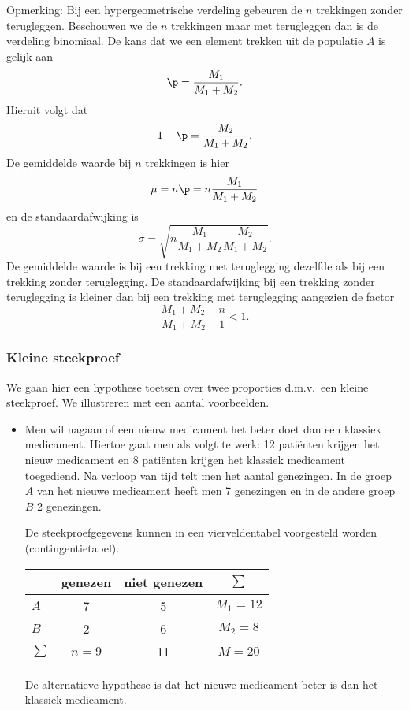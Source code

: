 {\begin{enumerate}
\end{enumerate}

{\sc Opmerking:}
Bij een hypergeometrische verdeling gebeuren de $n$ trekkingen zonder 
terugleggen. Beschouwen we de $n$ trekkingen maar met terugleggen dan is de 
verdeling binomiaal. De kans dat we een element trekken uit de populatie $A$ is
gelijk aan 
$$\p = \frac{M_1}{M_1+M_2}.$$
Hieruit volgt dat
$$1-\p = \frac{M_2}{M_1+M_2}.$$
De gemiddelde waarde bij $n$ trekkingen is hier
$$\mu = n\p = n\frac{M_1}{M_1+M_2}$$
en de standaardafwijking is
$$\sigma = \sqrt{n\frac{M_1}{M_1+M_2}\frac{M_2}{M_1+M_2}}.$$
De gemiddelde waarde is bij een trekking met teruglegging dezelfde 
als bij een trekking zonder teruglegging. De standaardafwijking bij een trekking
zonder teruglegging is 
kleiner dan bij een trekking met teruglegging aangezien de factor
$$\frac{M_1+M_2-n}{M_1+M_2-1}<1.$$ 


\subsubsection{Kleine steekproef}
We gaan hier een hypothese toetsen over twee proporties d.m.v.\ een kleine 
steekproef. We 
illustreren met een aantal voorbeelden.
\begin{itemize}
\item Men wil nagaan of een nieuw medicament het beter doet dan een klassiek 
medicament. Hiertoe gaat men als volgt te werk: 12 pati\"enten krijgen het nieuw
medicament en 8 pati\"enten krijgen het klassiek medicament toegediend. Na 
verloop van tijd telt men het aantal genezingen. In de groep $A$ van het 
nieuwe 
medicament heeft men 7 genezingen en in de andere groep $B$ 2 genezingen.



De steekproefgegevens kunnen in een vierveldentabel voorgesteld worden 
(contingentietabel).

\begin{center}
\begin{tabular}{l|c|c|c}
  & genezen & niet genezen & $\sum$\\
  \hline
$A$ & 7 & 5 & $M_1=12$\\
  \hline
$B$ & 2 & 6 & $M_2=8$\\
  \hline
$\sum$ & $n=9$ & 11 & $M=20$
\end{tabular}
  \end{center}
  
De alternatieve hypothese is dat het nieuwe medicament beter is dan
het klassiek medicament.


\end{itemize}}
